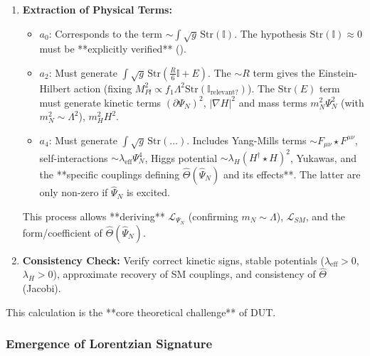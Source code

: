 \documentclass[11pt, a4paper]{article}
\theoremstyle{remark}
\newcommand{\Op}[1]{\hat{#1}}
\newcommand{\Str}{\mathrm{Str}}
\begin{document}
\begin{enumerate}[label=\arabic*., itemsep=1pt, topsep=2pt]
    \item \textbf{Extraction of Physical Terms:}
    \begin{itemize}
        \item \(a_0\): Corresponds to the term \( \sim \int \sqrt{g} \, \Str(\mathbb{I}) \). The hypothesis \( \Str(\mathbb{I}) \approx 0 \) must be **explicitly verified** ().
        \item \(a_2\): Must generate \( \int \sqrt{g} \, \Str(\frac{R}{6} \mathbb{I} + E) \). The \( \sim R \) term gives the Einstein-Hilbert action (fixing \( M_{Pl}^2 \propto f_1 \Lambda^2 \Str(\mathbb{I}_{\text{relevant?}}) \)). The \( \Str(E) \) term must generate kinetic terms \( (\partial \Psi_N)^2 \), \( |\nabla H|^2 \) and mass terms \( m_N^2 \Psi_N^2 \) (with \( m_N^2 \sim \Lambda^2 \)), \( m_H^2 H^2 \).
        \item \(a_4\): Must generate \( \int \sqrt{g} \, \Str(\dots) \). Includes Yang-Mills terms \( \sim F_{\mu\nu} \star F^{\mu\nu} \), self-interactions \( \sim \lambda_{\text{eff}} \Psi_N^4 \), Higgs potential \( \sim \lambda_H (H^\dagger \star H)^2 \), Yukawas, and the **specific couplings defining \( \Op{\Theta}(\Op{\Psi}_N) \) and its effects**. The latter are only non-zero if \( \Op{\Psi}_N \) is excited.
    \end{itemize}
    This process allows **deriving** \( \mathcal{L}_{\Psi_N} \) (confirming \( m_N \sim \Lambda \)), \( \mathcal{L}_{SM} \), and the form/coefficient of \( \Op{\Theta}(\Op{\Psi}_N) \).

    \item \textbf{Consistency Check:}
    Verify correct kinetic signs, stable potentials (\( \lambda_{\text{eff}} > 0 \), \( \lambda_H > 0 \)), approximate recovery of SM couplings, and consistency of \( \Op{\Theta} \) (Jacobi).
\end{enumerate}
This calculation is the **core theoretical challenge** of DUT.

\subsubsection{Emergence of Lorentzian Signature}
\label{ssubsec:lorentz_sig_emergent_final_detailed}
\end{document}
